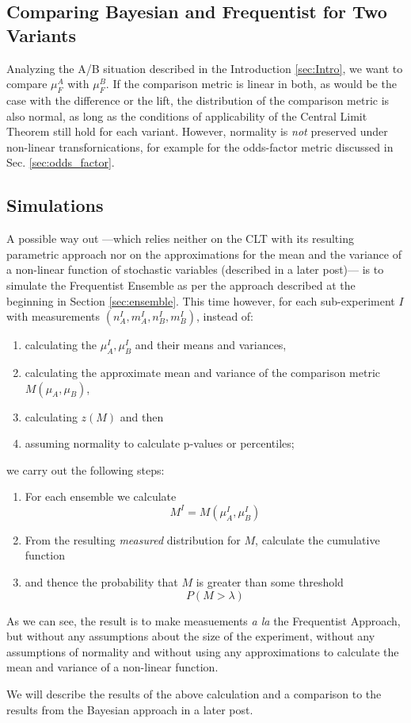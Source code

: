 \documentclass[12pt]{report}
\newcommand{\be}{\begin{enumerate}} %
\newcommand{\ee}{\end{enumerate}} %
\newcommand{\bdm}{\begin{displaymath}} %
\newcommand{\edm}{\end{displaymath}} %
\begin{document}
\subsection{Comparing Bayesian and Frequentist for Two Variants}
Analyzing the A/B situation described in the Introduction
\ref{sec:Intro}, we want to compare \(\mu^A_F\) with \(\mu^B_F\). If the
comparison metric is linear in both, as would be the case with the difference
or the lift, the distribution of the comparison metric is also normal, as long
as the conditions of applicability of the Central Limit Theorem still hold for
each variant. However, normality is {\em not} preserved under non-linear
transfornications, for example for the odds-factor metric discussed in
Sec. \ref{sec:odds_factor}.

\subsection{Simulations}
A possible way out ---which relies neither on the CLT with its
resulting parametric approach nor on the approximations for the mean and the
variance of a non-linear function of stochastic variables (described in a
later post)--- is to simulate
the Frequentist Ensemble as per the approach described at the beginning in
Section \ref{sec:ensemble}.
This time however, for each sub-experiment \(I\) with
measurements \((n^I_A, m^I_A, n^I_B, m^I_B)\), instead of:
\be
\item calculating the
  \(\mu^I_A, \mu^I_B\) and their means and variances,
\item calculating the approximate mean and variance of the
  comparison metric \(M(\mu_A, \mu_B)\),
\item calculating \(z(M)\) and then
\item assuming normality to calculate p-values or percentiles;
\ee
we carry out the following steps:
\be
\item For each ensemble we calculate
  \bdm
  M^I = M(\mu^I_A, \mu^I_B)
  \edm
\item From the resulting {\em measured} distribution for \(M\), calculate
  the cumulative function
\item and thence the probability that \(M\) is greater
  than some threshold
  \bdm
  P(M>\lambda)
  \edm
\ee
As we can see, the result is to make measuements {\em a la} the Frequentist
Approach, but without any assumptions about the size of the experiment,
without any assumptions of normality and without using any approximations to
calculate the mean and variance of a non-linear function.  

We will describe the results of the above calculation and a comparison to the
results from the Bayesian approach in a later post.
\end{document}

